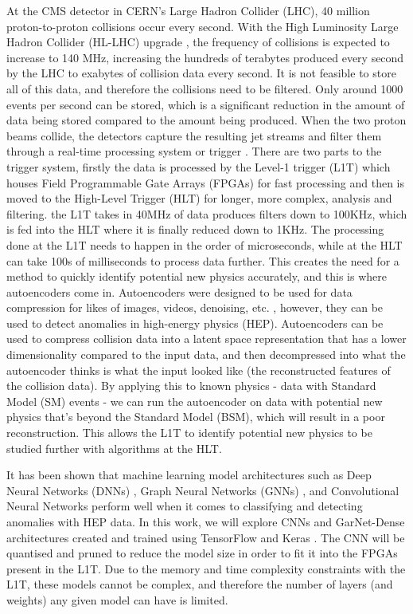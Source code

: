 \documentclass[a4paper]{article}
\theoremstyle{plain}
\theoremstyle{definition}
\begin{document}
    At the CMS detector in CERN's Large Hadron Collider (LHC), 40 million proton-to-proton collisions occur every second. With the High Luminosity Large Hadron Collider (HL-LHC) upgrade \cite{hl-lhc}, the frequency of collisions is expected to increase to 140 MHz, increasing the hundreds of terabytes produced every second by the LHC to exabytes of collision data every second. It is not feasible to store all of this data, and therefore the collisions need to be filtered. Only around 1000 events per second can be stored, which is a significant reduction in the amount of data being stored compared to the amount being produced. When the two proton beams collide, the detectors capture the resulting jet streams and filter them through a real-time processing system or trigger \cite{trigger-system}. There are two parts to the trigger system, firstly the data is processed by the Level-1 trigger (L1T) which houses Field Programmable Gate Arrays (FPGAs) for fast processing and then is moved to the High-Level Trigger (HLT) for longer, more complex, analysis and filtering. the L1T takes in 40MHz of data produces filters down to 100KHz, which is fed into the HLT where it is finally reduced down to 1KHz. The processing done at the L1T needs to happen in the order of microseconds, while at the HLT can take 100s of milliseconds to process data further. This creates the need for a method to quickly identify potential new physics accurately, and this is where autoencoders come in. Autoencoders \cite{autoencoders} were designed to be used for data compression for likes of images, videos, denoising, etc. \cite{image-autoencoder}, however, they can be used to detect anomalies in high-energy physics (HEP). Autoencoders can be used to compress collision data into a latent space representation that has a lower dimensionality compared to the input data, and then decompressed into what the autoencoder thinks is what the input looked like (the reconstructed features of the collision data). By applying this to known physics - data with Standard Model (SM) events - we can run the autoencoder on data with potential new physics that's beyond the Standard Model (BSM), which will result in a poor reconstruction. This allows the L1T to identify potential new physics to be studied further with algorithms at the HLT.
    
    It has been shown that machine learning model architectures such as Deep Neural Networks (DNNs) \cite{dnn}, Graph Neural Networks (GNNs) \cite{garnet, garnet2}, and Convolutional Neural Networks \cite{katya} perform well when it comes to classifying and detecting anomalies with HEP data.  In this work, we will explore CNNs and GarNet-Dense architectures created and trained using TensorFlow \cite{tensorflow} and Keras \cite{keras}. The CNN will be quantised and pruned to reduce the model size in order to fit it into the FPGAs present in the L1T. Due to the memory and time complexity constraints with the L1T, these models cannot be complex, and therefore the number of layers (and weights) any given model can have is limited. 
    
\end{document}
